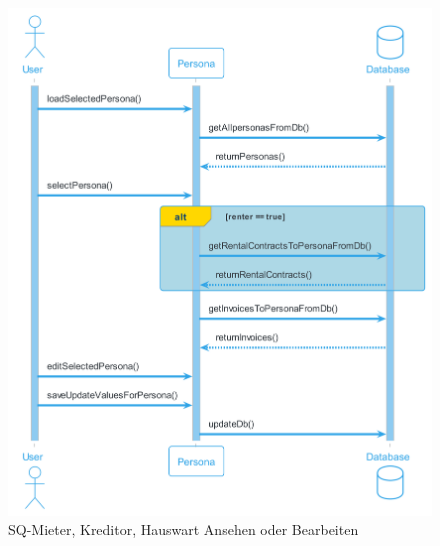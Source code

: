 \begin{figure}[H]
  \begin{center}
    \includegraphics[width=0.65\textheight]{content/diagrams/out/sequenzdiagram/personAnsehen/personAnsehen.png}
    \caption{SQ-Mieter, Kreditor, Hauswart Ansehen oder Bearbeiten}
  \end{center}
\end{figure}

